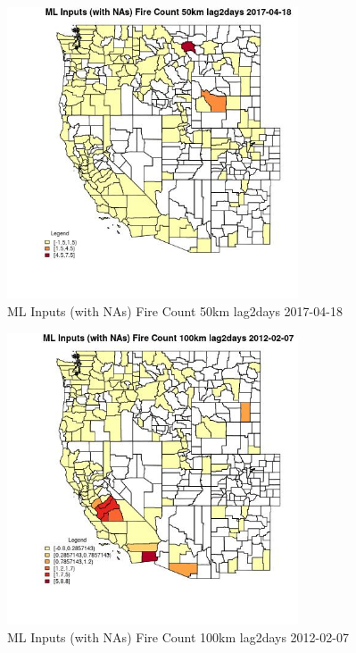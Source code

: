 \begin{figure} 
\centering  
\includegraphics[width=0.77\textwidth]{Code_Outputs/Report_ML_input_PM25_Step4_part_f_de_duplicated_aveswNAs_CountyFire_Count_50km_lag2daysMean2017-04-18.jpg} 
\caption{\label{fig:Report_ML_input_PM25_Step4_part_f_de_duplicated_aveswNAsCountyFire_Count_50km_lag2daysMean2017-04-18}ML Inputs (with NAs) Fire Count 50km lag2days 2017-04-18} 
\end{figure} 
 

\clearpage 

\begin{figure} 
\centering  
\includegraphics[width=0.77\textwidth]{Code_Outputs/Report_ML_input_PM25_Step4_part_f_de_duplicated_aveswNAs_CountyFire_Count_100km_lag2daysMean2012-02-07.jpg} 
\caption{\label{fig:Report_ML_input_PM25_Step4_part_f_de_duplicated_aveswNAsCountyFire_Count_100km_lag2daysMean2012-02-07}ML Inputs (with NAs) Fire Count 100km lag2days 2012-02-07} 
\end{figure} 
 

